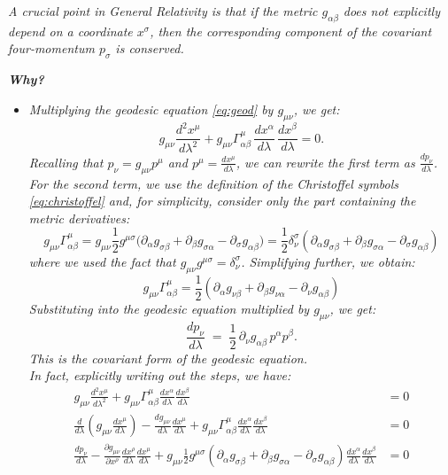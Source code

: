 \textit{A crucial point in General Relativity is that if the metric \(g_{\alpha\beta}\) does not explicitly depend on a coordinate \(x^\sigma\), then the corresponding component of the covariant four-momentum \(p_\sigma\) is conserved.}

\textit{\textbf{Why?}}

\begin{itemize}
\item \textit{Multiplying the geodesic equation \eqref{eq:geod} by $g_{\mu\nu}$, we get:}
 \[
 g_{\mu\nu}\frac{d^2x^\mu}{d\lambda^2} + g_{\mu\nu}\Gamma^\mu_{\alpha\beta}\,\frac{dx^\alpha}{d\lambda}\,\frac{dx^\beta}{d\lambda} = 0.
 \]
 \textit{Recalling that $p_\nu = g_{\mu\nu}p^{\mu}$ and $p^\mu = \frac{dx^\mu}{d\lambda}$, we can rewrite the first term as $\frac{dp_\nu}{d\lambda}$.}
 \textit{For the second term, we use the definition of the Christoffel symbols \eqref{eq:christoffel} and, for simplicity, consider only the part containing the metric derivatives:}
 \[
 g_{\mu\nu}\Gamma^\mu_{\alpha\beta} = g_{\mu\nu} \frac{1}{2}g^{\mu\sigma} \bigl(\partial_\alpha g_{\sigma\beta} + \partial_\beta g_{\sigma\alpha} - \partial_\sigma g_{\alpha\beta}\bigr) = \frac{1}{2} \delta^\sigma_\nu \left( \partial_\alpha g_{\sigma\beta} + \partial_\beta g_{\sigma\alpha} - \partial_\sigma g_{\alpha\beta} \right)
 \]
 \textit{where we used the fact that $g_{\mu\nu}g^{\mu\sigma} = \delta^\sigma_\nu$. Simplifying further, we obtain:}
 \[
 g_{\mu\nu}\Gamma^\mu_{\alpha\beta} = \frac{1}{2} \left( \partial_\alpha g_{\nu\beta} + \partial_\beta g_{\nu\alpha} - \partial_\nu g_{\alpha\beta} \right)
 \]
\textit{Substituting into the geodesic equation multiplied by $g_{\mu\nu}$, we get:}
 \[
 \frac{dp_\nu}{d\lambda}
 \;=\;
 \frac12\,\partial_\nu g_{\alpha\beta}\,p^\alpha p^\beta.
 \]
\textit{This is the covariant form of the geodesic equation.}\\
\textit{In fact, explicitly writing out the steps, we have:}
\begin{align*}
  g_{\mu\nu} \frac{d^2 x^\mu}{d\lambda^2} + g_{\mu\nu} \Gamma^\mu_{\alpha\beta} \frac{dx^\alpha}{d\lambda} \frac{dx^\beta}{d\lambda} &= 0 \\
  \frac{d}{d\lambda} \left( g_{\mu\nu} \frac{dx^\mu}{d\lambda} \right) - \frac{dg_{\mu\nu}}{d\lambda}\frac{dx^\mu}{d\lambda} + g_{\mu\nu} \Gamma^\mu_{\alpha\beta} \frac{dx^\alpha}{d\lambda} \frac{dx^\beta}{d\lambda} &= 0 \\
  \frac{dp_\nu}{d\lambda} - \frac{\partial g_{\mu\nu}}{\partial x^\rho} \frac{dx^\rho}{d\lambda}\frac{dx^\mu}{d\lambda} + g_{\mu\nu} \frac{1}{2} g^{\mu\sigma} \left( \partial_\alpha g_{\sigma\beta} + \partial_\beta g_{\sigma\alpha} - \partial_\sigma g_{\alpha\beta} \right) \frac{dx^\alpha}{d\lambda} \frac{dx^\beta}{d\lambda} &= 0 \\

\end{align*}
\end{itemize}
